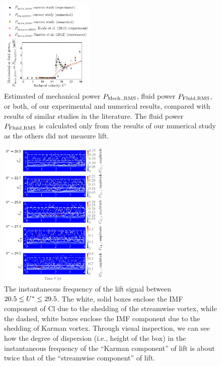 \documentclass[oneside]{utmthesis}
\begin{document}
\begin{figure}
  \centering
  \includegraphics[width=0.4\textwidth]{figs/powerComparison}
  \caption{Estimated \rms{} of mechanical power $P_{\text{Mech.,RMS}}$, fluid power $P_{\text{Fluid,RMS}}$, or both, of our experimental and numerical results, compared with results of similar studies in the literature. The fluid power $P_{\text{Fluid,RMS}}$ is calculated only from the results of our numerical study as the others did not measure lift.}
  \label{fig:powerComparison}
\end{figure}

\begin{figure}
  \centering
  \includegraphics[width=0.47\textwidth]{figs/instantLiftFreq}
  \caption{The instantaneous frequency of the lift signal between $20.5 \leq U^{*} \leq 29.5$. The white, solid boxes enclose the IMF component of Cl due to the shedding of the streamwise vortex, while the dashed, white boxes enclose the IMF component due to the shedding of Karman vortex. Through visual inspection, we can see how the degree of dispersion (i.e., height of the box) in the instantaneous frequency of the ``Karman component'' of lift is about twice that of the ``streamwise component'' of lift.}
  \label{fig:instantLiftFreq}
\end{figure}
\end{document}
